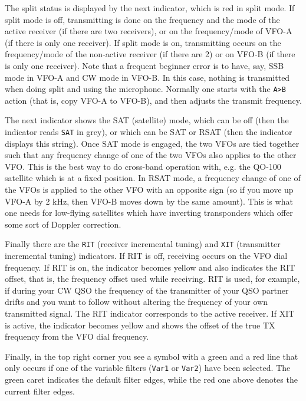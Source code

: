\documentclass[12pt]{book}
\def\rett#1{\texttt{\color{red}#1}}
\def\bltt#1{\texttt{\color{blue}#1}}
\begin{document}
The split status is displayed by the next indicator, which is red in
split mode. If split mode is off, transmitting is done on the frequency
and the mode of the active receiver (if there are two receivers), or
on the frequency/mode of VFO-A (if there is only one receiver). If
split mode is on, transmitting occurs on the frequency/mode of the
non-active receiver (if there are 2) or on VFO-B (if there is only  one
receiver). Note that a frequent beginner error is to have, say,
SSB mode in VFO-A and CW mode in VFO-B. In this case, nothing is
transmitted when doing split and using the microphone. Normally one
starts with the \bltt{A>B} action (that is, copy VFO-A to VFO-B), and
then adjusts the transmit frequency.

The next indicator shows the SAT (satellite) mode, which can be off
(then the indicator reads \rett{SAT} in grey), or which can be SAT or RSAT
(then the indicator displays this string). Once SAT mode is engaged,
the two VFOs are tied together such that any frequency change of one
of the two VFOs also applies to the other VFO. This is the best way
to do cross-band operation with, e.g. the QO-100 satellite which is at
a fixed position. In RSAT mode, a frequency change of one of the VFOs
is applied to the other VFO with an opposite sign (so if you move up
VFO-A by 2 kHz, then VFO-B moves down by the same amount). This is
what one needs for low-flying satellites which have inverting
transponders which offer some sort of Doppler correction.

Finally there are the \rett{RIT} (receiver incremental tuning) and \rett{XIT}
(transmitter incremental tuning) indicators. If RIT is off,
receiving occurs on the VFO dial frequency. If RIT is on, the
indicator becomes yellow and also indicates the RIT offset, that is,
the frequency offset used while receiving. RIT is used, for example,
if during your CW QSO the frequency of the transmitter of your
QSO partner drifts and you want to follow without altering the
frequency of your own transmitted signal. The RIT indicator
corresponds to the active receiver. If XIT is active, the
indicator becomes yellow and shows the offset of the true
TX frequency from the VFO dial frequency.

Finally, in the top right corner you see a symbol with a green and a red line
that only occurs if
one of the variable filters (\texttt{Var1} or \texttt{Var2}) have been
selected. The green caret indicates the default filter edges,  while the
red one above denotes the current filter edges.
\end{document}
